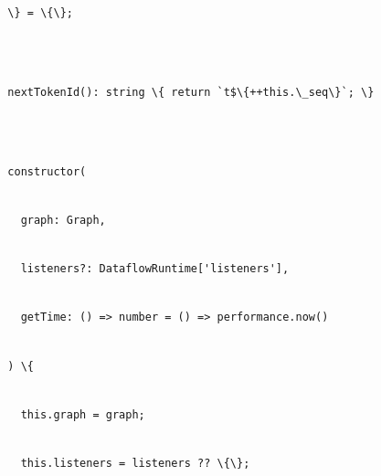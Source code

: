 \documentclass[
]{article}
\newcommand{\passthrough}[1]{#1}
\begin{document}
\passthrough{\lstinline!  !}\passthrough{\lstinline!\}!}\passthrough{\lstinline! !}\passthrough{\lstinline!=!}\passthrough{\lstinline! !}\passthrough{\lstinline!\{\};!}\strut \\
\strut \\
\passthrough{\lstinline!  !}\passthrough{\lstinline!nextTokenId!}\passthrough{\lstinline!():!}\passthrough{\lstinline! !}\passthrough{\lstinline!string!}\passthrough{\lstinline! !}\passthrough{\lstinline!\{!}\passthrough{\lstinline! !}\passthrough{\lstinline!return!}\passthrough{\lstinline! !}\passthrough{\lstinline!`t$\{++!}\passthrough{\lstinline!this.\_seq!}\passthrough{\lstinline!\}`;!}\passthrough{\lstinline! !}\passthrough{\lstinline!\}!}\strut \\
\strut \\
\passthrough{\lstinline!  !}\passthrough{\lstinline!constructor(!}\strut \\
\passthrough{\lstinline!    !}\passthrough{\lstinline!graph:!}\passthrough{\lstinline! !}\passthrough{\lstinline!Graph,!}\strut \\
\passthrough{\lstinline!    !}\passthrough{\lstinline!listeners?:!}\passthrough{\lstinline! !}\passthrough{\lstinline!DataflowRuntime!}\passthrough{\lstinline!['listeners'],!}\strut \\
\passthrough{\lstinline!    !}\passthrough{\lstinline!getTime!}\passthrough{\lstinline!:!}\passthrough{\lstinline! !}\passthrough{\lstinline!()!}\passthrough{\lstinline! !}\passthrough{\lstinline!=>!}\passthrough{\lstinline! !}\passthrough{\lstinline!number!}\passthrough{\lstinline! !}\passthrough{\lstinline!=!}\passthrough{\lstinline! !}\passthrough{\lstinline!()!}\passthrough{\lstinline! !}\passthrough{\lstinline!=>!}\passthrough{\lstinline! !}\passthrough{\lstinline!performance.now!}\passthrough{\lstinline!()!}\strut \\
\passthrough{\lstinline!  !}\passthrough{\lstinline!)!}\passthrough{\lstinline! !}\passthrough{\lstinline!\{!}\strut \\
\passthrough{\lstinline!    !}\passthrough{\lstinline!this.graph!}\passthrough{\lstinline! !}\passthrough{\lstinline!=!}\passthrough{\lstinline! !}\passthrough{\lstinline!graph;!}\strut \\
\passthrough{\lstinline!    !}\passthrough{\lstinline!this.listeners!}\passthrough{\lstinline! !}\passthrough{\lstinline!=!}\passthrough{\lstinline! !}\passthrough{\lstinline!listeners!}\passthrough{\lstinline! !}\passthrough{\lstinline!??!}\passthrough{\lstinline! !}\passthrough{\lstinline!\{\};!}\strut \\
\end{document}
